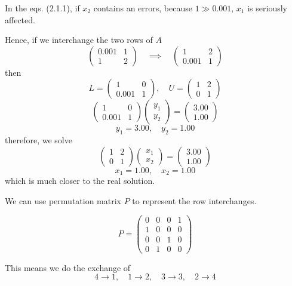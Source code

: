 In the eqs. (2.1.1), if $x_2$ contains an errors, because $1 \gg 0.001$, $x_1$ is seriously affected.

Hence, if we interchange the two rows of $A$ \[
    \begin{pmatrix}
        0.001 & 1 \\
        1 & 2
    \end{pmatrix} \quad \implies \quad \begin{pmatrix}
        1 & 2 \\
        0.001 & 1
    \end{pmatrix}
\]
then \[
    L = \begin{pmatrix}
        1 & 0 \\
        0.001 & 1
    \end{pmatrix}, \quad U = \begin{pmatrix}
        1 & 2 \\
        0 & 1
    \end{pmatrix}
\]
\[
    \begin{pmatrix}
        1 & 0 \\
        0.001 & 1
    \end{pmatrix} \begin{pmatrix}
        y_1 \\ y_2
    \end{pmatrix} = \begin{pmatrix}
        3.00\\ 1.00
    \end{pmatrix}
\]
\[
    y_1 = 3.00, \quad y_2 = 1.00
\]
therefore, we solve
\[
    \begin{pmatrix}
        1 & 2 \\
        0 & 1
    \end{pmatrix} \begin{pmatrix}
        x_1 \\ x_2
    \end{pmatrix} = \begin{pmatrix}
        3.00\\ 1.00
    \end{pmatrix}
\]
\[
    x_1 = 1.00, \quad x_2 = 1.00
\]
which is much closer to the real solution.

\begin{remark}
    We can use permutation matrix $P$ to represent the row interchanges.
\end{remark}

\newpage
\begin{eg}
    \[
        P = \begin{pmatrix}
            0 & 0 & 0 & 1\\
            1 & 0 & 0 & 0 \\
            0 & 0 & 1 & 0 \\
            0 & 1 & 0 & 0
        \end{pmatrix}
    \]
\end{eg}
This means we do the exchange of \[
    4 \to 1, \quad 1 \to 2, \quad 3 \to 3, \quad 2 \to 4
\]

